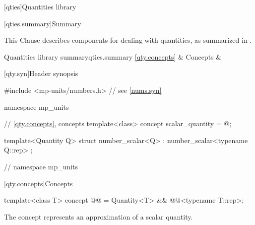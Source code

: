 [qties]{Quantities library}

[qties.summary]{Summary}

\pnum
This Clause describes components for dealing with quantities,
as summarized in .

\begin{modularlibsumtab}{Quantities library summary}{qties.summary}
\ref{qty.concepts}      & Concepts                               &  \\
\end{modularlibsumtab}

[qty.syn]{Header  synopsis}

%
%
\begin{codeblock}
#include <mp-units/numbers.h>  // see \ref{nums.syn}

namespace mp_units {

// \ref{qty.concepts}, concepts
template<class>
concept scalar_quantity = @\seebelow@;

template<Quantity Q>
struct number_scalar<Q> : number_scalar<typename Q::rep> {};

}  // namespace mp_units
\end{codeblock}

[qty.concepts]{Concepts}

\begin{itemdecl}
template<class T>
concept @@ = Quantity<T> && @@<typename T::rep>;
\end{itemdecl}

\begin{itemdescr}
\pnum
\begin{note}
The  concept
represents an approximation of a scalar quantity.
\end{note}
\end{itemdescr}
